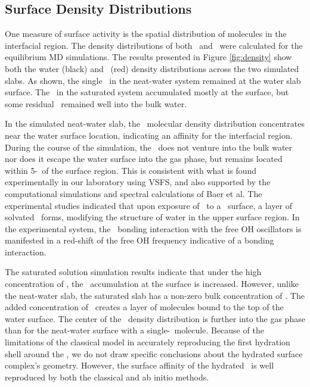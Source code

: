 \documentclass{article}
\begin{document}
\subsection{Surface Density Distributions}

One measure of surface activity is the spatial distribution of molecules in the interfacial region. The density distributions of both \wat~and \suldiox~were calculated for the equilibrium MD simulations. The results presented in Figure \ref{fig:density} show both the water (black) and \suldiox~(red) density distributions across the two simulated slabs. As shown, the single \suldiox~in the neat-water system remained at the water slab surface. The \suldiox~in the saturated system accumulated mostly at the surface, but some residual \suldiox~remained well into the bulk water.


In the simulated neat-water slab, the \suldiox~molecular density distribution concentrates near the water surface location, indicating an affinity for the interfacial region. During the course of the simulation, the \suldiox~does not venture into the bulk water nor does it escape the water surface into the gas phase, but remains located within 5-\angs~of the surface region. This is consistent with what is found experimentally in our laboratory using VSFS,\cite{Tarbuck2005,Tarbuck2006} and also supported by the computational simulations and spectral calculations of Baer et al.\cite{Baer2010} The experimental studies indicated that upon exposure of \suldiox~to a \wat~surface, a layer of solvated \suldiox~forms, modifying the structure of water in the upper surface region. In the experimental system, the \suldiox~bonding interaction with the free OH oscillators is manifested in a red-shift of the free OH frequency indicative of a bonding interaction. 

The saturated solution simulation results indicate that under the high concentration of \suldiox, the \suldiox~accumulation at the surface is increased. However, unlike the neat-water slab, the saturated slab has a non-zero bulk concentration of \suldiox. The added concentration of \suldiox~creates a layer of molecules bound to the top of the water surface. The center of the \suldiox~density distribution is further into the gas phase than for the neat-water surface with a single-\suldiox~molecule. Because of the limitations of the classical model in accurately reproducing the first hydration shell around the \suldiox, we do not draw specific conclusions about the hydrated surface complex's geometry. However, the surface affinity of the hydrated \suldiox~is well reproduced by both the classical and ab initio methods.\cite{Baer2010}
\end{document}
